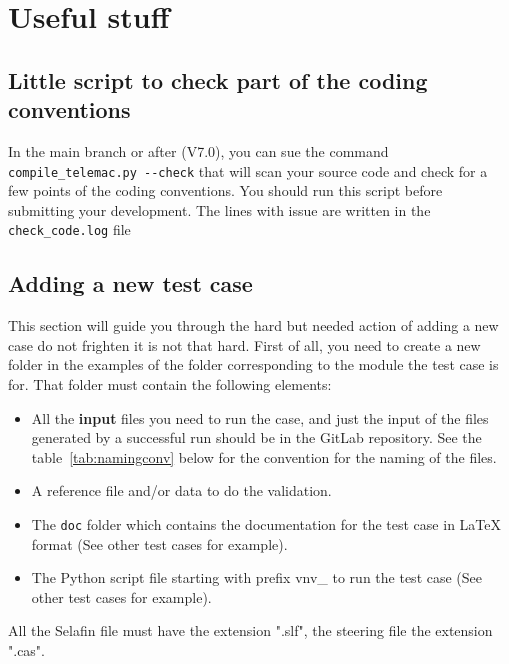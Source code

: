 %
\chapter{Useful stuff}
%
\section{Little script to check part of the coding conventions}
%
In the main branch or after (V7.0), you can sue the command
\verb!compile_telemac.py --check! that will scan your source code and check for
a few points of the coding conventions. You should run this script before
submitting your development. The lines with issue are written in the
\verb!check_code.log! file

\section{Adding a new test case}
%
\label{testcase}
This section will guide you through the hard but needed action of adding a new
case do not frighten it is not that hard. First of all, you need to create a new
folder in the examples of the folder corresponding to the module the test case
is for. That folder must contain the following elements:
\begin{itemize}
\item All the \textbf{input} files you need to run the case, and just the input of
the files generated by a successful run should be in the GitLab repository.
See the table~\ref{tab:namingconv} below for the convention for the naming of
the files.
\item A reference file and/or data to do the validation.
\item The \verb!doc! folder which contains the documentation for the test case
in LaTeX format (See other test cases for example).
\item The Python script file starting with prefix vnv\_ to run the test case
  (See other test cases for example).
\end{itemize}
All the Selafin file must have the extension ".slf", the steering file the
extension ".cas".

